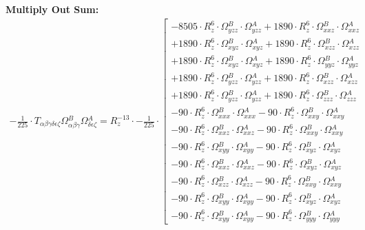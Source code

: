 \documentclass{article}
\begin{document}
\textbf{Multiply Out Sum:}
\begin{subequations}\begin{gather}
- \frac{1}{225} \cdot T_{\alpha{}\beta{}\gamma{}\delta{}\epsilon{}\zeta{}} \Omega{}^{B}_{\alpha{}\beta{}\gamma{}} \Omega{}^{A}_{\delta{}\epsilon{}\zeta{}} = R_{z}^{-13} \cdot - \frac{1}{225} \cdot  \left[ \begin{array}{c} 
 		- 8505 \cdot R_{z}^{6} \cdot \Omega{}^{B}_{yzz} \cdot \Omega{}^{A}_{yzz}+ 1890 \cdot R_{z}^{6} \cdot \Omega{}^{B}_{xxz} \cdot \Omega{}^{A}_{xxz} 
 \\[0.2em] 		 + 1890 \cdot R_{z}^{6} \cdot \Omega{}^{B}_{xyz} \cdot \Omega{}^{A}_{xyz}+ 1890 \cdot R_{z}^{6} \cdot \Omega{}^{B}_{xzz} \cdot \Omega{}^{A}_{xzz} 
 \\[0.2em] 		 + 1890 \cdot R_{z}^{6} \cdot \Omega{}^{B}_{xyz} \cdot \Omega{}^{A}_{xyz}+ 1890 \cdot R_{z}^{6} \cdot \Omega{}^{B}_{yyz} \cdot \Omega{}^{A}_{yyz} 
 \\[0.2em] 		 + 1890 \cdot R_{z}^{6} \cdot \Omega{}^{B}_{yzz} \cdot \Omega{}^{A}_{yzz}+ 1890 \cdot R_{z}^{6} \cdot \Omega{}^{B}_{xzz} \cdot \Omega{}^{A}_{xzz} 
 \\[0.2em] 		 + 1890 \cdot R_{z}^{6} \cdot \Omega{}^{B}_{yzz} \cdot \Omega{}^{A}_{yzz}+ 1890 \cdot R_{z}^{6} \cdot \Omega{}^{B}_{zzz} \cdot \Omega{}^{A}_{zzz} 
 \\[0.2em] 		 - 90 \cdot R_{z}^{6} \cdot \Omega{}^{B}_{xxx} \cdot \Omega{}^{A}_{xxx}- 90 \cdot R_{z}^{6} \cdot \Omega{}^{B}_{xxy} \cdot \Omega{}^{A}_{xxy} 
 \\[0.2em] 		 - 90 \cdot R_{z}^{6} \cdot \Omega{}^{B}_{xxz} \cdot \Omega{}^{A}_{xxz}- 90 \cdot R_{z}^{6} \cdot \Omega{}^{B}_{xxy} \cdot \Omega{}^{A}_{xxy} 
 \\[0.2em] 		 - 90 \cdot R_{z}^{6} \cdot \Omega{}^{B}_{xyy} \cdot \Omega{}^{A}_{xyy}- 90 \cdot R_{z}^{6} \cdot \Omega{}^{B}_{xyz} \cdot \Omega{}^{A}_{xyz} 
 \\[0.2em] 		 - 90 \cdot R_{z}^{6} \cdot \Omega{}^{B}_{xxz} \cdot \Omega{}^{A}_{xxz}- 90 \cdot R_{z}^{6} \cdot \Omega{}^{B}_{xyz} \cdot \Omega{}^{A}_{xyz} 
 \\[0.2em] 		 - 90 \cdot R_{z}^{6} \cdot \Omega{}^{B}_{xzz} \cdot \Omega{}^{A}_{xzz}- 90 \cdot R_{z}^{6} \cdot \Omega{}^{B}_{xxy} \cdot \Omega{}^{A}_{xxy} 
 \\[0.2em] 		 - 90 \cdot R_{z}^{6} \cdot \Omega{}^{B}_{xyy} \cdot \Omega{}^{A}_{xyy}- 90 \cdot R_{z}^{6} \cdot \Omega{}^{B}_{xyz} \cdot \Omega{}^{A}_{xyz} 
 \\[0.2em] 		 - 90 \cdot R_{z}^{6} \cdot \Omega{}^{B}_{xyy} \cdot \Omega{}^{A}_{xyy}- 90 \cdot R_{z}^{6} \cdot \Omega{}^{B}_{yyy} \cdot \Omega{}^{A}_{yyy} 

\end{array}
\end{gather}
\end{subequations}
\end{document}
